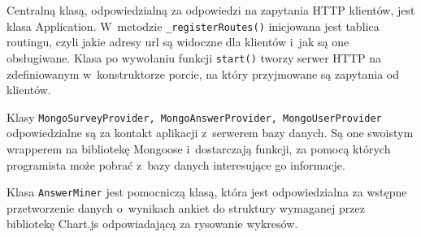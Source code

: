 \documentclass[12pt,a4paper,notitlepage]{article}
\begin{document}
\par Centralną klasą, odpowiedzialną za odpowiedzi na zapytania HTTP klientów, jest klasa Application. W~metodzie \texttt{\_registerRoutes()} inicjowana jest tablica routingu, czyli jakie adresy url są widoczne dla klientów i~jak są one obsługiwane. Klasa po wywołaniu funkcji \texttt{start()} tworzy serwer HTTP na zdefiniowanym w~konstruktorze porcie, na który przyjmowane są zapytania od klientów.

\par Klasy \texttt{MongoSurveyProvider, MongoAnswerProvider, MongoUserProvider} odpowiedzialne są za kontakt aplikacji z~serwerem bazy danych. Są one swoistym wrapperem na bibliotekę Mongoose i~dostarczają funkcji, za pomocą których programista może pobrać z~bazy danych interesujące go informacje.

\par Klasa \texttt{AnswerMiner} jest pomocniczą klasą, która jest odpowiedzialna za wstępne przetworzenie danych o~wynikach ankiet do struktury wymaganej przez bibliotekę Chart.js odpowiadającą za rysowanie wykresów.
\end{document}
